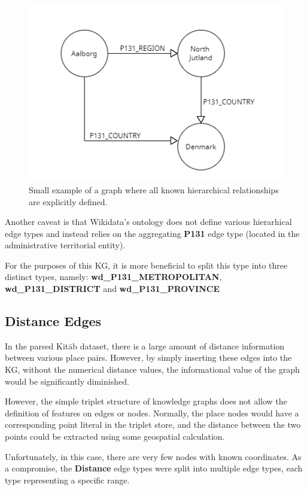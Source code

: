 \begin{figure}[h] %
    \centering %
    \includegraphics[width=0.7\linewidth]{figures/kg-dense} %
    \caption{Small example of a graph where all known hierarchical relationships are explicitly defined.} %
    \label{fig:kg-dense} %
\end{figure}

Another caveat is that Wikidata's ontology does not define various hierarhical edge types and instead relies on
the aggregating \textbf{P131} edge type (located in the administrative territorial entity).

For the purposes of this KG, it is more beneficial to split this type into three distinct types, namely:
\textbf{wd\_P131\_METROPOLITAN}, \textbf{wd\_P131\_DISTRICT} and \textbf{wd\_P131\_PROVINCE}


\subsection{Distance Edges}
In the parsed Kitāb dataset, there is a large amount of distance information between various place pairs.
However, by simply inserting these edges into the KG,
without the numerical distance values, the informational value of the graph would be significantly diminished.

However, the simple triplet structure of knowledge graphs does not allow the definition of features on edges or nodes.
Normally, the place nodes would have a corresponding point literal in the triplet store, and the distance
between the two points could be extracted using some geospatial calculation.

Unfortunately, in this case, there are very few nodes with known coordinates.
As a compromise, the \textbf{Distance} edge types were split into multiple edge types, each
type representing a specific range.

